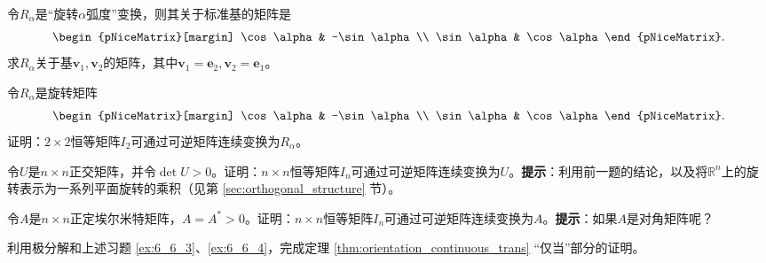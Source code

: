 \begin{problemset}
    \item 令$R_\alpha$是“旋转$\alpha$弧度”变换，则其关于标准基的矩阵是
    \[\begin{pNiceMatrix}[margin]
        \cos\alpha & -\sin\alpha \\ \sin\alpha & \cos\alpha
    \end{pNiceMatrix}.\]求$R_\alpha$关于基$\mathbf{v}_1,\mathbf{v}_2$的矩阵，其中$\mathbf{v}_1=\mathbf{e}_2,\mathbf{v}_2=\mathbf{e}_1$。
    \item \label{ex:6_6_2} 令$R_\alpha$是旋转矩阵\[\begin{pNiceMatrix}[margin]
        \cos\alpha & -\sin\alpha \\ \sin\alpha & \cos\alpha
    \end{pNiceMatrix}.\]证明：$2\times 2$恒等矩阵$I_2$可通过可逆矩阵连续变换为$R_\alpha$。
    \item \label{ex:6_6_3} 令$U$是$n\times n$正交矩阵，并令$\det U>0$。证明：$n\times n$恒等矩阵$I_n$可通过可逆矩阵连续变换为$U$。{\bf 提示}：利用前一题的结论，以及将$\mathbb{R}^n$上的旋转表示为一系列平面旋转的乘积（见第 \ref{sec:orthogonal_structure} 节）。
    \item \label{ex:6_6_4} 令$A$是$n\times n$正定埃尔米特矩阵，$A=A^*>0$。证明：$n\times n$恒等矩阵$I_n$可通过可逆矩阵连续变换为$A$。{\bf 提示}：如果$A$是对角矩阵呢？
    \item \label{ex:6_6_5} 利用极分解和上述习题 \ref{ex:6_6_3}、\ref{ex:6_6_4}，完成定理 \ref{thm:orientation_continuous_trans} “仅当”部分的证明。
\end{problemset}